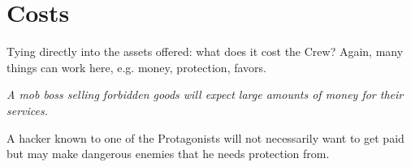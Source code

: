 \documentclass[12pt,a4paper,openany,usenames,dvipsnames]{book}
\begin{document}
	\section*{Costs}
	Tying directly into the assets offered: what does it cost the Crew?
	Again, many things can work here, e.g. money, protection, favors.
	\begin{exampleblock}
		\itshape A mob boss selling forbidden goods will expect large amounts of money for their services.\par
		A hacker known to one of the Protagonists will not necessarily want to get paid
			but may make dangerous enemies that he needs protection from.
	\end{exampleblock}

\end{document}
